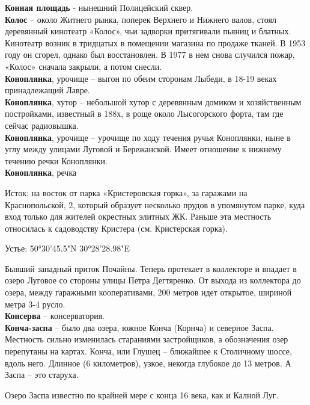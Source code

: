 \textbf{Конная площадь} - нынешний Полицейский сквер.\\

\textbf{Колос} – около Житнего рынка, поперек Верхнего и Нижнего валов, стоял деревянный кинотеатр «Колос», чьи задворки притягивали пьяниц и блатных. Кинотеатр возник в тридцатых в помещении магазина по продаже тканей. В 1953 году он сгорел, однако был восстановлен. В 1977 в нем снова случился пожар, «Колос» сначала закрыли, а потом снесли.\\

\textbf{Коноплянка}, урочище – выгон по обеим сторонам Лыбеди, в 18-19 веках принадлежащий Лавре.\\

\textbf{Коноплянка}, хутор – небольшой хутор с деревянным домиком и хозяйственным постройками, известный в 188х, в роще около Лысогорского форта, там где сейчас радиовышка.\\  

\textbf{Коноплянка}, урочище – урочище по ходу течения ручья Коноплянки, ныне в углу между улицами Луговой и Бережанской. Имеет отношение к нижнему течению речки Коноплянки.\\

\textbf{Коноплянка}, речка

Исток: на восток от парка «Кристеровская горка», за гаражами на Краснопольской, 2, который образует несколько прудов в упомянутом парке, куда вход только для жителей окрестных элитных ЖК. Раньше эта местность относилась к садоводству Кристера (см. Кристерская горка).

Устье: 50°30'45.5"N 30°28'28.98"E

Бывший западный приток Почайны. Теперь протекает в коллекторе и впадает в озеро Луговое со стороны улицы Петра Дегтяренко. От выхода из коллектора до озера, между гаражными кооперативами, 200 метров идет открытое, шириной метра 3-4 русло.\\

\textbf{Консерва} – консерватория.\\

\textbf{Конча-заспа} – было два озера, южное Конча (Корнча) и северное Заспа. Местность сильно изменилась стараниями застройщиков, а обозначения озер перепутаны на картах. Конча, или Глушец – ближайшее к Столичному шоссе, вдоль него. Длинное (6 километров), узкое, некогда глубокое до 13 метров. А Заспа – это старуха.

Озеро Заспа известно по крайней мере с конца 16 века, как и Калной Луг.

